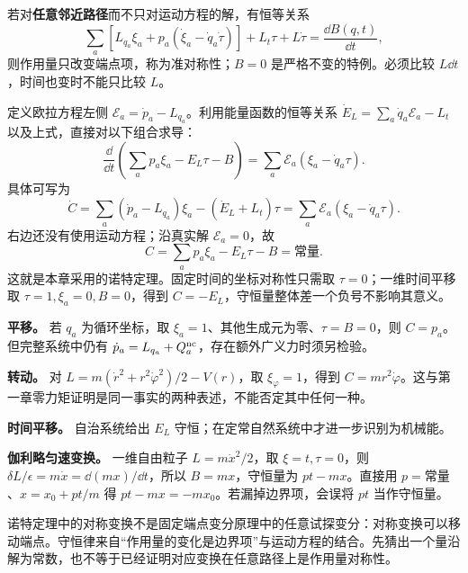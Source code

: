若对\textbf{任意邻近路径}而不只对运动方程的解，有恒等关系
\begin{equation}\label{eq:symmetry-total-derivative}
\sum_a\left[L_{q_a}\xi_a+p_a(\dot\xi_a-\dot q_a\dot\tau)\right]
+L_t\tau+L\dot\tau=\frac{\dd B(q,t)}{\dd t},
\end{equation}
则作用量只改变端点项，称为准对称性；$B=0$ 是严格不变的特例。必须比较 $L\dd t$，时间也变时不能只比较 $L$。

定义欧拉方程左侧 $\mathcal E_a=\dot p_a-L_{q_a}$。利用能量函数的恒等关系
$\dot E_L=\sum_a\dot q_a\mathcal E_a-L_t$
以及上式，直接对以下组合求导：
\begin{equation}\label{eq:noether-identity}
\frac{\dd}{\dd t}\left(\sum_ap_a\xi_a-E_L\tau-B\right)
=\sum_a\mathcal E_a(\xi_a-\dot q_a\tau).
\end{equation}
具体可写为
\[
\dot C=\sum_a(\dot p_a-L_{q_a})\xi_a-(\dot E_L+L_t)\tau
=\sum_a\mathcal E_a(\xi_a-\dot q_a\tau).
\]
右边还没有使用运动方程；沿真实解 $\mathcal E_a=0$，故
\begin{equation}\label{eq:noether-charge}
\boxed{C=\sum_ap_a\xi_a-E_L\tau-B=\text{常量}.}
\end{equation}
这就是本章采用的诺特定理。固定时间的坐标对称性只需取 $\tau=0$；一维时间平移取 $\tau=1,\xi_a=0,B=0$，得到 $C=-E_L$，守恒量整体差一个负号不影响其意义。

\begin{example}[三个对称性及一个边界项]
\textbf{平移。} 若 $q_a$ 为循环坐标，取 $\xi_a=1$、其他生成元为零、$\tau=B=0$，则 $C=p_a$。但完整系统中仍有 $\dot p_a=L_{q_a}+Q_a^{\rm nc}$，存在额外广义力时须另检验。

\textbf{转动。} 对 $L=m(\dot r^2+r^2\dot\varphi^2)/2-V(r)$，取 $\xi_\varphi=1$，得到 $C=mr^2\dot\varphi$。这与第一章零力矩证明是同一事实的两种表述，不能否定其中任何一种。

\textbf{时间平移。} 自治系统给出 $E_L$ 守恒；在定常自然系统中才进一步识别为机械能。

\textbf{伽利略匀速变换。} 一维自由粒子 $L=m\dot x^2/2$，取 $\xi=t,\tau=0$，则 $\delta L/\epsilon=m\dot x=\dd(mx)/\dd t$，所以 $B=mx$，守恒量为 $pt-mx$。直接用 $p=\text{常量}$、$x=x_0+pt/m$ 得 $pt-mx=-mx_0$。若漏掉边界项，会误将 $pt$ 当作守恒量。
\end{example}
\begin{physicsbox}
诺特定理中的对称变换不是固定端点变分原理中的任意试探变分：对称变换可以移动端点。守恒律来自“作用量的变化是边界项”与运动方程的结合。先猜出一个量沿解为常数，也不等于已经证明对应变换在任意路径上是作用量对称性。
\end{physicsbox}

